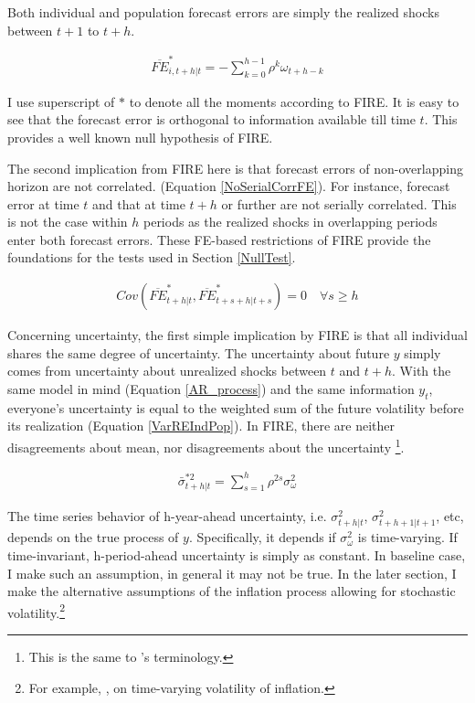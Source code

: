 \documentclass[12pt]{article}
\begin{document}
	Both individual and population forecast errors are simply the realized shocks between $t+1$ to $t+h$.  
	
	\begin{eqnarray}\label{NoPastInfFE}
		\overline{FE}^{*}_{i,t+h|t} = - \sum^{h-1}_{k=0} \rho^k \omega_{t+h-k}
	\end{eqnarray}
	
	I use superscript of $*$ to denote all the moments according to FIRE. It is easy to see that the forecast error is orthogonal to information available till time $t$. This provides a well known null hypothesis of FIRE.
	
	The second implication from FIRE here is that forecast errors of non-overlapping horizon are not correlated. (Equation \ref{NoSerialCorrFE}). For instance, forecast error at time $t$ and that at time $t+h$ or further are not serially correlated. This is not the case within $h$ periods as the realized shocks in overlapping periods enter both forecast errors.  These FE-based restrictions of FIRE provide the foundations for the tests used in Section \ref{NullTest}. 
	
	\begin{eqnarray}\label{NoSerialCorrFE}
		Cov(\overline{FE}^{*}_{t+h|t}, \overline{FE}^{*}_{t+s+h|t+s}) = 0 \quad \forall s \geq h
	\end{eqnarray}
	
	Concerning uncertainty, the first simple implication by FIRE is that all individual shares the same degree of uncertainty. The uncertainty about future $y$ simply comes from uncertainty about unrealized shocks between $t$ and $t+h$. With the same model in mind (Equation \ref{AR_process}) and the same information $y_t$, everyone's uncertainty is equal to the weighted sum of the future volatility before its realization (Equation \ref{VarREIndPop}). In FIRE, there are neither disagreements about mean, nor disagreements about the uncertainty \footnote{This is the same to \citet{jurado2015measuring}'s terminology.}. 
	
	\begin{eqnarray}\label{VarREIndPop}
		\bar \sigma^{*2}_{t+h|t} = \sum^{h}_{s=1}\rho^{2s} \sigma^2_{\omega}
	\end{eqnarray}
	
	The time series behavior of h-year-ahead uncertainty, i.e. $\sigma^2_{t+h|t}$, $\sigma^2_{t+h+1|t+1}$, etc, depends on the true process of $y$. Specifically, it depends if $\sigma^2_\omega$ is time-varying. If time-invariant, h-period-ahead uncertainty is simply as constant. In baseline case, I make such an assumption, in general it may not be true. In the later section, I make the alternative assumptions of the inflation process allowing for  stochastic volatility.\footnote{For example, \citet{justiniano2008time}, \citet{vavra2013inflation} on time-varying volatility of inflation.} 
	
\end{document}
